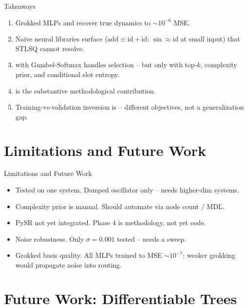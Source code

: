 \documentclass[
11pt,notheorems,hyperref={pdfauthor=Aniruddha Pandey}
]{beamer}
\begin{document}
\begin{frame}{Takeaways}
\begin{enumerate}
    \item Grokked MLPs  and recover true dynamics to $\sim 10^{-6}$ MSE.
    \item Naive neural libraries surface  ($\mathrm{add} \equiv \mathrm{id}+\mathrm{id}$; $\sin \approx \mathrm{id}$ at small input) that STLSQ cannot resolve.
    \item {} with Gumbel-Softmax handles selection -- but only with top-$k$, complexity prior, and conditional slot entropy.
    \item {} is the substantive methodological contribution.
    \item Training-vs-validation inversion is  -- different objectives, not a generalization gap.
\end{enumerate}
\end{frame}

\section{Limitations and Future Work}

\begin{frame}{Limitations and Future Work}
\begin{itemize}
    \item \alert{Tested on one system.} Damped oscillator only -- needs higher-dim systems.
    \item \alert{Complexity prior is manual.} Should automate via node count / MDL.
    \item \alert{PySR not yet integrated.} Phase 4 is methodology, not yet code.
    \item \alert{Noise robustness.} Only $\sigma=0.001$ tested -- needs a sweep.
    \item \alert{Grokked basis quality.} All MLPs trained to MSE $\sim 10^{-7}$; weaker grokking would propagate noise into routing.
\end{itemize}
\end{frame}

\section{Future Work: Differentiable Trees}
\end{document}
